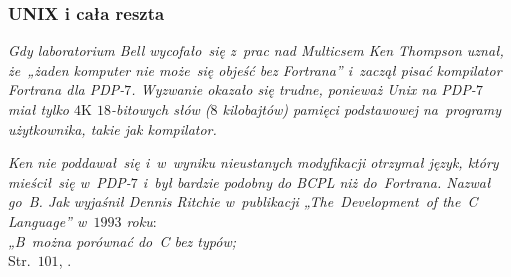 \documentclass[10pt,t]{beamer}
\begin{document}
\begin{frame}
  \frametitle{UNIX i cała reszta}


  \textit{Gdy laboratorium Bell wycofało~się z~prac nad Multicsem
    Ken Thompson uznał, że~„żaden komputer nie może~się objeść bez
    Fortrana” i~zaczął pisać kompilator Fortrana dla PDP-$7$.
    Wyzwanie okazało się trudne, ponieważ Unix na PDP-$7$ miał
    tylko $4\text{K}$ $18$-bitowych słów ($8$ kilobajtów) pamięci
    podstawowej na~programy użytkownika, takie jak kompilator.}

  \textit{Ken nie poddawał~się i~w~wyniku nieustanych modyfikacji otrzymał
    język, który mieścił~się w~PDP-$7$ i~był bardzie podobny do BCPL niż
    do~Fortrana. Nazwał go~B. Jak wyjaśnił Dennis Ritchie w~publikacji
    „The~Development~of the~C Language” w~$1993$ roku}: \\
  \textit{„B~można porównać do~C bez typów;}
  \\[0.3em]
  Str.~$101$, \parencite{Kernighan-Jak-Unix-tworzyl-historie-Pub-2021}.

\end{frame}

























\end{document}
